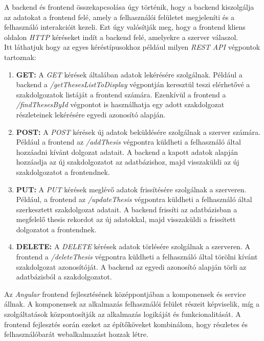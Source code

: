 A backend és frontend összekapcsolása úgy történik, hogy a backend kiszolgálja az adatokat a frontend felé, amely a felhasználói felületet megjeleníti és a felhasználó interakcióit kezeli. Ezt úgy valósítják meg, hogy a frontend kliens oldalon \textit{HTTP} kéréseket indít a backend felé, amelyekre a szerver válaszol.\\

Itt láthatjuk hogy az egyes kéréstípusokhoz például milyen \textit{REST API} végpontok tartoznak:

\begin{enumerate}

\item{\textbf{GET:}}
A \textit{GET} kérések általában adatok lekérésére szolgálnak. Például a backend a \textit{/getThesesListToDisplay} végpontján keresztül teszi elérhetővé a szakdolgozatok listáját a frontend számára. Ezenkívül a frontend a \textit{/findThesesById} végpontot is használhatja egy adott szakdolgozat részleteinek lekérésére egyedi azonosító alapján.

\item{\textbf{POST:}}
A \textit{POST} kérések új adatok beküldésére szolgálnak a szerver számára. Például a frontend az \textit{/addThesis} végpontra küldheti a felhasználó által hozzáadni kívánt dolgozat adatait. A backend a kapott adatok alapján hozzáadja az új szakdolgozatot az adatbázishoz, majd visszaküldi az új szakdolgozatot a frontendnek.

\item{\textbf{PUT:}}
A \textit{PUT} kérések meglévő adatok frissítésére szolgálnak a szerveren. Például, a frontend az \textit{/updateThesis} végpontra küldheti a felhasználó által szerkesztett szakdolgozat adatait. A backend frissíti az adatbázisban a megfelelő thesis rekordot az új adatokkal, majd visszaküldi a frissített dolgozatot a frontendnek.

\item{\textbf{DELETE:}}
A \textit{DELETE} kérések adatok törlésére szolgálnak a szerveren. A frontend a \textit{/deleteThesis} végpontra küldheti a felhasználó által törölni kívánt szakdolgozat azonosítóját. A backend az egyedi azonosító alapján törli az adatbázisból a szakdolgozatot.

\end{enumerate}



Az \textit{Angular} \cite{angular} frontend fejlesztésének középpontjában a komponensek és service állnak. A komponensek az alkalmazás felhasználói felület részeit képviselik, míg a szolgáltatások központosítják az alkalmazás logikáját és funkcionalitását. A frontend fejlesztés során ezeket az építőköveket kombinálom, hogy részletes és felhasználóbarát webalkalmazást hozzak létre.

